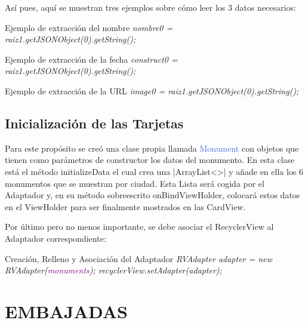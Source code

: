 \documentclass[letterpaper,twocolumn,openany,nodeprecatedcode,dvipsnames,nomultitoc]{dndbook}
\begin{document}
\begin{justify}
Así pues, aquí se muestran tres ejemplos sobre cómo leer los 3 datos necesarios:
\begin{DndSidebar}{Ejemplo de extracción del nombre}
  \textit{nombre0 = raiz1.getJSONObject(0).getString(\textcolor{OliveGreen}{});}
    \end{DndSidebar}
    
    \begin{DndSidebar}{Ejemplo de extracción de la fecha}
  \textit{construct0 = raiz1.getJSONObject(0).getString(\textcolor{OliveGreen}{});}
    \end{DndSidebar}
    
    \begin{DndSidebar}{Ejemplo de extracción de la URL}
  \textit{image0 = raiz1.getJSONObject(0).getString(\textcolor{OliveGreen}{});}
    \end{DndSidebar}

\subsection{Inicialización de las Tarjetas}
Para este propósito se creó una clase propia llamada \textcolor{RoyalBlue}{Monument} con objetos que tienen como parámetros de constructor los datos del monumento. En esta clase está el método \textcolor{BurntOrange}{initializeData} el cual crea una |ArrayList<>| y añade en ella los 6 monumentos que se muestran por ciudad. Esta Lista será cogida por el Adaptador y, en su método sobreescrito \textcolor{BurntOrange}{onBindViewHolder}, colocará estos datos en el ViewHolder para ser finalmente mostrados en las CardView.
\par
\vspace{3pt}
Por último pero no menos importante, se debe asociar el RecyclerView al Adaptador correspondiente:
\begingroup
\DndSetThemeColor[PhbMauve]
\begin{DndSidebar}{Creación, Relleno y Asociación del Adaptador}
  \textit{RVAdapter adapter = new RVAdapter(\textcolor{purple}{monuments});    
                recyclerView.setAdapter(adapter);}
\end{DndSidebar}
\endgroup

\newpage
\section{EMBAJADAS}
\vspace{5pt}

\end{justify}
\end{document}
